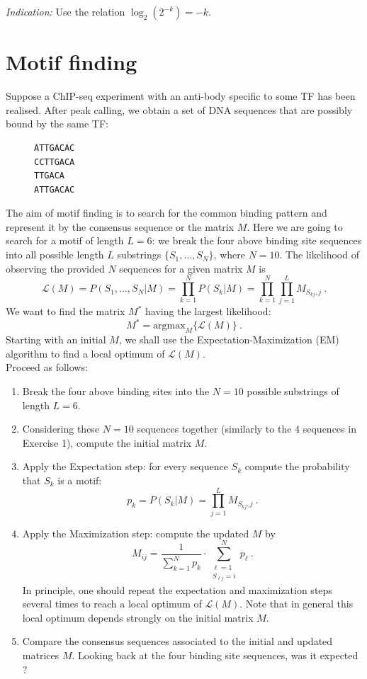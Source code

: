 \documentclass[a4paper,11pt]{article}
\begin{document}
\noindent \textit{Indication:} Use the relation $\log_2(2^{-k})=-k$.

\newpage
\section{Motif finding}

\noindent Suppose a ChIP-seq experiment with an anti-body specific to some TF has been realised. After peak calling, we obtain a set of DNA sequences that are possibly bound by the same TF:

\begin{figure}[h!]
\centering
\begin{BVerbatim}
ATTGACAC
CCTTGACA
TTGACA
ATTGACAC
\end{BVerbatim}
\end{figure}

\noindent The aim of motif finding is to search for the common binding pattern and represent it by the consensus sequence or the matrix $M$. Here we are going to search for a motif of length $L=6$: we break the four above binding site sequences into all possible length $L$ substrings $\{S_1, \dots, S_N\}$, where $N=10$. The likelihood of observing the provided $N$ sequences for a given matrix $M$ is
$$
\mathcal{L}(M) = P(S_1,\dots,S_N | M) = \prod_{k=1}^N  P(S_k | M) = \prod_{k=1}^N \prod_{j=1}^L M_{S_{kj},j}~.
$$
We want to find the matrix $M^*$ having the largest likelihood:
$$
M^* = \mbox{argmax}_{M} \{\mathcal{L}(M)\}~.
$$
Starting with an initial $M$, we shall use the Expectation-Maximization (EM) algorithm to find a local optimum of $\mathcal{L}(M)$. \\

\noindent Proceed as follows:

\begin{enumerate}
\item Break the four above binding sites into the $N=10$ possible substrings of length $L=6$.
\item Considering these $N=10$ sequences together (similarly to the 4 sequences in Exercise 1), compute the initial matrix $M$.
\item Apply the Expectation step: for every sequence $S_k$ compute the probability that $S_k$ is a motif:
$$
p_k = P(S_k | M) = \prod_{j=1}^L M_{S_{kj},j}~.
$$
\item Apply the Maximization step: compute the updated $M$ by 
$$
M_{ij} = \frac{1}{\sum_{k=1}^N p_k} \cdot \sum_{\substack{\ell = 1 \\ S_{\ell j} = i }}^N p_\ell~.
$$
In principle, one should repeat the expectation and maximization steps several times to reach a local optimum of $\mathcal{L}(M)$. Note that in general this local optimum depends strongly on the initial matrix $M$.
\item Compare the consensus sequences associated to the initial and updated matrices $M$. Looking back at the four binding site sequences, was it expected ?
\end{enumerate}
\end{document}

